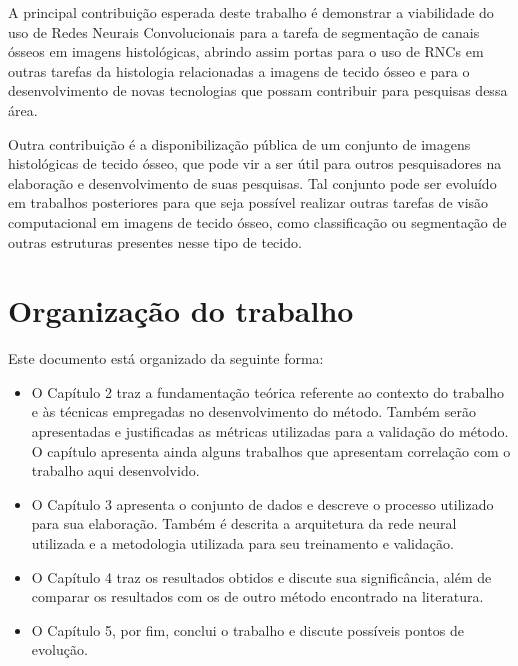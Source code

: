     A principal contribuição esperada deste trabalho é demonstrar a viabilidade do uso de Redes Neurais Convolucionais para a tarefa de segmentação de canais ósseos em imagens histológicas, abrindo assim portas para o uso de \ac{RNC}s em outras tarefas da histologia relacionadas a imagens de tecido ósseo e para o desenvolvimento de novas tecnologias que possam contribuir para pesquisas dessa área.
    
Outra contribuição é a disponibilização pública de um conjunto de imagens histológicas de tecido ósseo, que pode vir a ser útil para outros pesquisadores na elaboração e desenvolvimento de suas pesquisas. Tal conjunto pode ser evoluído em trabalhos posteriores para que seja possível realizar outras tarefas de visão computacional em imagens de tecido ósseo, como classificação ou segmentação de outras estruturas presentes nesse tipo de tecido.  

\section{Organização do trabalho}

Este documento está organizado da seguinte forma:

\begin{itemize}
    \item O Capítulo 2 traz a fundamentação teórica referente ao contexto do trabalho e às  técnicas empregadas no desenvolvimento do método. Também serão apresentadas e justificadas as métricas utilizadas para a validação do método. O capítulo apresenta ainda alguns trabalhos que apresentam correlação com o trabalho aqui desenvolvido.
    \item O Capítulo 3 apresenta o conjunto de dados e descreve o processo utilizado para sua elaboração. Também é descrita a arquitetura da rede neural utilizada e a metodologia utilizada para seu treinamento e validação.
    \item O Capítulo 4 traz os resultados obtidos e discute sua significância, além de comparar os resultados com os de outro método encontrado na literatura.
    \item O Capítulo 5, por fim, conclui o trabalho e discute possíveis pontos de evolução. 
\end{itemize}